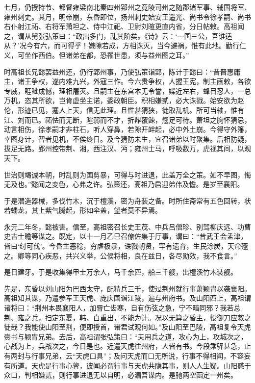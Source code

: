 \documentclass[12pt,UTF8]{ctexbook}
\begin{document}
七月，仍授持节、都督雍梁南北秦四州郢州之竟陵司州之随郡诸军事、辅国将军、雍州刺史。其月，明帝崩，东昏即位，扬州刺史始安王遥光、尚书令徐孝嗣、尚书右仆射江祏、右将军萧坦之、侍中江祀、卫尉刘暄更直内省，分日帖敕。高祖闻之，谓从舅张弘策曰：“政出多门，乱其阶矣。《诗》云：‘一国三公，吾谁适从？’况今有六，而可得乎！嫌隙若成，方相诛灭，当今避祸，惟有此地。勤行仁义，可坐作西伯。但诸弟在都，恐罹世患，须与益州图之耳。”

时高祖长兄懿罢益州还，仍行郢州事，乃使弘策诣郢，陈计于懿曰：“昔晋惠庸主，诸王争权，遂内难九兴，外寇三作。今六贵争权，人握王宪，制主画敕，各欲专威，睚眦成憾，理相屠灭。且嗣主在东宫本无令誉，媟近左右，蜂目忍人，一总万机，恣其所欲，岂肯虚坐主诺，委政朝臣。积相嫌贰，必大诛戮。始安欲为赵伦，形迹已见，蹇人上天，信无此理。且性甚猜狭，徒取乱机。所可当轴，惟有江、刘而已。祏怯而无断，暄弱而不才，折鼎覆餗，翘足可待。萧坦之胸怀猜忌，动言相伤，徐孝嗣才非柱石，听人穿鼻，若隙开衅起，必中外土崩。今得守外籓，幸图身计，智者见机，不俟终日。及今猜防未生，宜召诸弟以时聚集。后相防疑，拔足无路。郢州控带荆、湘，西注汉、沔；雍州士马，呼吸数万，虎视其间，以观天下。

世治则竭诚本朝，时乱则为国剪暴，可得与时进退，此盖万全之策。如不早图，悔无及也。”懿闻之变色，心弗之许。弘策还，高祖乃启迎弟伟及憺。是岁至襄阳。

于是潜造器械，多伐竹木，沉于檀溪，密为舟装之备。时所住斋常有五色回转，状若蟠龙，其上紫气腾起，形如伞盖，望者莫不异焉。

永元二年冬，懿被害。信至，高祖密召长史王茂、中兵吕僧珍、别驾柳庆远、功曹史吉士瞻等谋之。既定，以十一月乙巳召僚佐集于厅事，谓曰：“昔武王会孟津，皆曰‘纣可伐’。今昏主恶稔，穷虐极暴，诛戮朝贤，罕有遗育，生民涂炭，天命殛之。卿等同心疾恶，共兴义举，公侯将相，良在兹日，各尽勋效，我不食言。”

是日建牙。于是收集得甲士万余人，马千余匹，船三千艘，出檀溪竹木装舰。

先是，东昏以刘山阳为巴西太守，配精兵三千，使过荆州就行事萧颖胄以袭襄阳。高祖知其谋，乃遣参军王天虎、庞庆国诣江陵，遍与州府书。及山阳西上，高祖谓诸将曰：“荆州本畏襄阳人，加脣亡齿寒，自有伤弦之急，宁不暗同邪？我若总荆、雍之兵，扫定东夏，韩、白重出，不能为计。况以无算之昏主，役御刀应敕之徒哉？我能使山阳至荆，便即授首，诸君试观何如。”及山阳至巴陵，高祖复令天虎赍书与颖胄兄弟。去后，高祖谓张弘策曰：“夫用兵之道，攻心为上，攻城次之，心战为上，兵战次之，今日是也。近遣天虎往州府，人皆有书。今段乘驿甚急，止有两封与行事兄弟，云“天虎口具”；及问天虎而口无所说，行事不得相闻，不容妄有所道。天虎是行事心膂，彼闻必谓行事与天虎共隐其事，则人人生疑。山阳惑于众口，判相嫌贰，则行事进退无以自明，必漏吾谋内。是驰两空函定一州矣。
\end{document}
